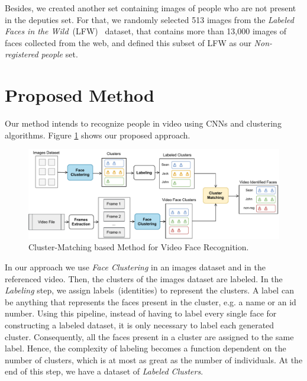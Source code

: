 Besides, we created another set containing images of people who are not present in the deputies set.
For that, we randomly selected 513 images from the \emph{Labeled Faces in the Wild}~(LFW)~\cite{LFWTech} dataset, that contains more than 13,000 images of faces collected from the web,
and defined this subset of LFW as our \emph{Non-registered people} set.

\section{Proposed Method}
\label{sec:recognition_method}

Our method intends to recognize people in video using CNNs and clustering algorithms.
Figure \ref{fig:cluster_matching} shows our proposed approach.

\begin{figure}[!ht]
    \centering
    \includegraphics[width=\textwidth]{img/face_recognition/cluster_matching_process.pdf}
    \caption{Cluster-Matching based Method for Video Face Recognition.}
    \label{fig:cluster_matching}
\end{figure}

In our approach we use \emph{Face Clustering} in an images dataset and in the referenced video. Then, the clusters of the images dataset are labeled. 
In the \textit{Labeling} step, we assign labels~(identities) to represent the clusters.
A label can be anything that represents the faces present in the cluster, e.g. a name or an id number. 
Using this pipeline, instead of having to label every single face for constructing a labeled dataset, it is only necessary to label each generated cluster.
Consequently, all the faces present in a cluster are assigned to the same label. 
Hence, the complexity of labeling becomes a function dependent on the number of clusters, which is at most as great as the number of individuals.
At the end of this step, we have a dataset of \emph{Labeled Clusters}.


